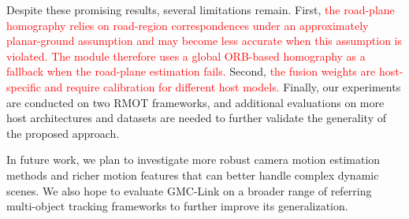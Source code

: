 \documentclass{article}
\begin{document}
Despite these promising results, several limitations remain. First, \textcolor{red}{the road-plane homography relies on road-region correspondences under an approximately planar-ground assumption and may become less accurate when this assumption is violated. The module therefore uses a global ORB-based homography as a fallback when the road-plane estimation fails.} Second, \textcolor{red}{the fusion weights are host-specific and require calibration for different host models.} Finally, our experiments are conducted on two RMOT frameworks, and additional evaluations on more host architectures and datasets are needed to further validate the generality of the proposed approach.

In future work, we plan to investigate more robust camera motion estimation methods and richer motion features that can better handle complex dynamic scenes. We also hope to evaluate GMC-Link on a broader range of referring multi-object tracking frameworks to further improve its generalization.



\end{document}
